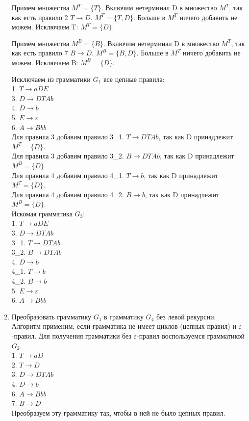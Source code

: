 \documentclass[a4paper,14pt]{extarticle}
\begin{document}
\begin{enumerate}[1.]
Примем множества $M^T = \{T\}$.
Включим нетерминал D в множество $M^T$, так как есть правило 2 $T \rightarrow D$.
$M^T = \{T, D\}$.
Больше в $M^T$ ничего добавить не можем. Исключаем T:
$M^T = \{D\}$.


Примем множества $M^B = \{B\}$.
Включим нетерминал D в множество $M^T$, так как есть правило 7 $B \rightarrow D$.
$M^B = \{B, D\}$.
Больше в $M^T$ ничего добавить не можем. Исключаем B:
$M^B = \{D\}$.


Исключаем из грамматики $G_1$ все цепные правила:\\
1. $T \rightarrow aDE$\\
3. $D \rightarrow DTAb$\\
4. $D \rightarrow b$\\
5. $E \rightarrow \varepsilon$\\
6. $A \rightarrow Bbb$\\

Для правила 3 добавим правило 3\_1. $T \rightarrow DTAb$, так как D принадлежит $M^T = \{D\}$.\\
Для правила 3 добавим правило 3\_2. $B \rightarrow DTAb$, так как D принадлежит $M^B = \{D\}$.\\
Для правила 4 добавим правило 4\_1. $T \rightarrow b$, так как D принадлежит $M^T = \{D\}$.\\
Для правила 4 добавим правило 4\_2. $B \rightarrow b$, так как D принадлежит $M^B = \{D\}$.\\

Искомая грамматика $G_3$:\\
1. $T \rightarrow aDE$\\
3. $D \rightarrow DTAb$\\
3\_1. $T \rightarrow DTAb$\\
3\_2. $B \rightarrow DTAb$\\
4. $D \rightarrow b$\\
4\_1. $T \rightarrow b$\\
4\_2. $B \rightarrow b$\\
5. $E \rightarrow \varepsilon$\\
6. $A \rightarrow Bbb$\\

\item Преобразовать грамматику $G_1$ в грамматику $G_4$ без левой рекурсии.\\

Алгоритм применим, если грамматика не имеет циклов (цепных правил) и $\varepsilon$-правил.
Для получения грамматики без $\varepsilon$-правил воспользуемся грамматикой $G_2$.\\
1. $T \rightarrow aD$\\
2. $T \rightarrow D$\\
3. $D \rightarrow DTAb$\\
4. $D \rightarrow b$\\
6. $A \rightarrow Bbb$\\
7. $B \rightarrow D$\\
Преобразуем эту грамматику так, чтобы в ней не было цепных правил.\\


\end{enumerate}
\end{document}
